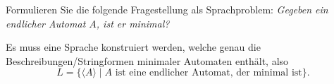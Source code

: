 Formulieren Sie die folgende Fragestellung als Sprachproblem:
{\em 
Gegeben ein endlicher Automat $A$, ist er minimal?
}

\begin{loesung}
Es muss eine Sprache konstruiert werden, welche genau die
Beschreibungen/Stringformen
minimaler Automaten enthält, also
\[
L
=
\{
\langle A\rangle
\mid
\text{$A$ ist eine endlicher Automat, der minimal ist}
\}.
\]
\end{loesung}
